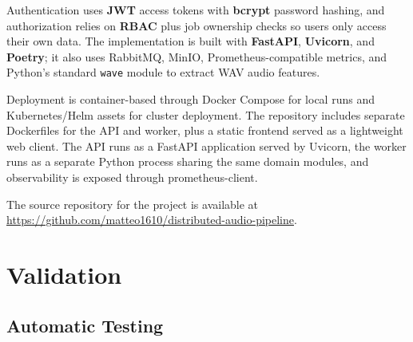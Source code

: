 \documentclass{scrartcl}
\begin{document}
Authentication uses \textbf{JWT} access tokens with \textbf{bcrypt} password hashing, and authorization relies on \textbf{RBAC} plus job ownership checks so users only access their own data. The implementation is built with \textbf{FastAPI}, \textbf{Uvicorn}, and \textbf{Poetry}; it also uses RabbitMQ, MinIO, Prometheus-compatible metrics, and Python's standard \texttt{wave} module to extract WAV audio features.

Deployment is container-based through Docker Compose for local runs and Kubernetes/Helm assets for cluster deployment. The repository includes separate Dockerfiles for the API and worker, plus a static frontend served as a lightweight web client. The API runs as a FastAPI application served by Uvicorn, the worker runs as a separate Python process sharing the same domain modules, and observability is exposed through prometheus-client.

The source repository for the project is available at \url{https://github.com/matteo1610/distributed-audio-pipeline}.



\section{Validation}\label{validation}

\subsection{Automatic Testing}\label{automatic-testing}

  
  
\end{document}

